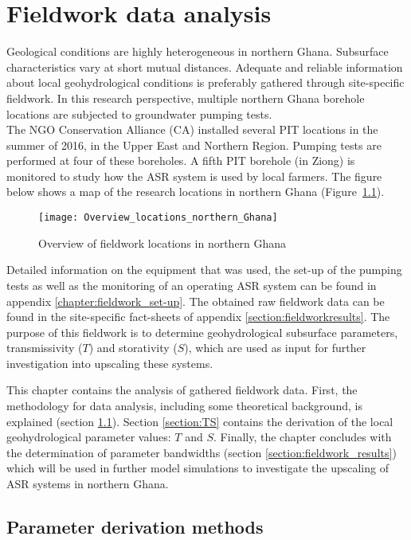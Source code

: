 \chapter{Fieldwork data analysis}
Geological conditions are highly heterogeneous in northern Ghana. Subsurface characteristics vary at short mutual distances. Adequate and reliable information about local geohydrological conditions is preferably gathered through site-specific fieldwork. In this research perspective, multiple northern Ghana borehole locations are subjected to groundwater pumping tests. 
\bigskip \\
The NGO Conservation Alliance (CA) installed several PIT locations in the summer of 2016, in the Upper East and Northern Region. Pumping tests are performed at four of these boreholes. A fifth PIT borehole (in Ziong) is monitored to study how the ASR system is used by local farmers. The figure below shows a map  of the research locations in northern Ghana (Figure~\ref{fig:Overviewlocations}).
\bigskip 

\begin{figure}[ht]
 \centering
 \texttt{[image: Overview\_locations\_northern\_Ghana]}
 \captionsetup{justification=centering} 
 \caption{Overview of fieldwork locations in northern Ghana}
 \label{fig:Overviewlocations}
\end{figure}

Detailed information on the equipment that was used, the set-up of the pumping tests as well as the monitoring of an operating ASR system can be found in appendix \ref{chapter:fieldwork_set-up}. The obtained raw fieldwork data can be found in the site-specific fact-sheets of appendix \ref{section:fieldworkresults}. The purpose of this fieldwork is to determine geohydrological subsurface parameters, transmissivity ($T$) and storativity ($S$), which are used as input for further investigation into upscaling these systems. 

This chapter contains the analysis of gathered fieldwork data. First, the methodology for data analysis, including some theoretical background, is explained (section \ref{section:derivation_methods}). Section \ref{section:TS} contains the derivation of the local geohydrological parameter values: $T$ and $S$. Finally, the chapter concludes with the determination of parameter bandwidths (section \ref{section:fieldwork_results}) which will be used in further model simulations to investigate the upscaling of ASR systems in northern Ghana. 

\section{Parameter derivation methods}
\label{section:derivation_methods}

